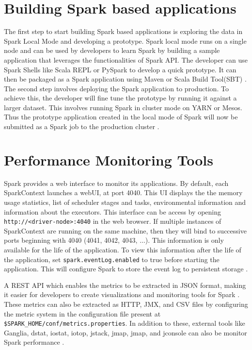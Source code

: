 \documentclass[9pt,twocolumn,twoside]{../../styles/osajnl}
\begin{document}
\section{Building Spark based applications}
The first step to start building Spark based applications is exploring
the data in Spark Local Mode and developing a prototype. Spark local
mode runs on a single node and can be used by developers to learn
Spark by building a sample application that leverages the
functionalities of Spark API. The developer can use Spark Shells like
Scala REPL or PySpark to develop a quick prototype. It can then be
packaged as a Spark application using Maven or Scala Build Tool(SBT)
\cite{www-hortonworks}.  The second step involves deploying the Spark
application to production. To achieve this, the developer will fine
tune the prototype by running it against a larger dataset. This
involves running Spark in cluster mode on YARN or Mesos. Thus the
prototype application created in the local mode of Spark will now be
submitted as a Spark job to the production cluster
\cite{www-hortonworks}.

\section{Performance Monitoring Tools}
Spark provides a web interface to monitor its applications. By
default, each SparkContext launches a webUI, at port 4040. This UI
displays the the memory usage statistics, list of scheduler stages and
tasks, environmental information and information about the executors.
This interface can be access by opening
\texttt{http://<driver-node>:4040} in the web browser.  If multiple
instances of SparkContext are running on the same machine, then they
will bind to successive ports beginning with 4040 (4041, 4042, 4043,
$\ldots$).  This information is only available for the life of the
application. To view this information after the life of the
application, set \texttt{spark.eventLog.enabled} to true before
starting the application.  This will configure Spark to store the
event log to persistent storage \cite{www-spark-ui}.

A REST API which enables the metrics to be extracted in JSON format,
making it easier for developers to create visualizations and
monitoring tools for Spark \cite{www-spark-ui}.  These metrics can
also be extracted as HTTP, JMX, and CSV files by configuring the
metric system in the configuration file present at
\texttt{\$SPARK\_HOME/conf/metrics.properties}. In addition to these,
external tools like Ganglia, dstat, iostat, iotop, jstack, jmap, jmap,
and jconsole can also be monitor Spark performance
\cite{www-spark-ui}.
\end{document}
